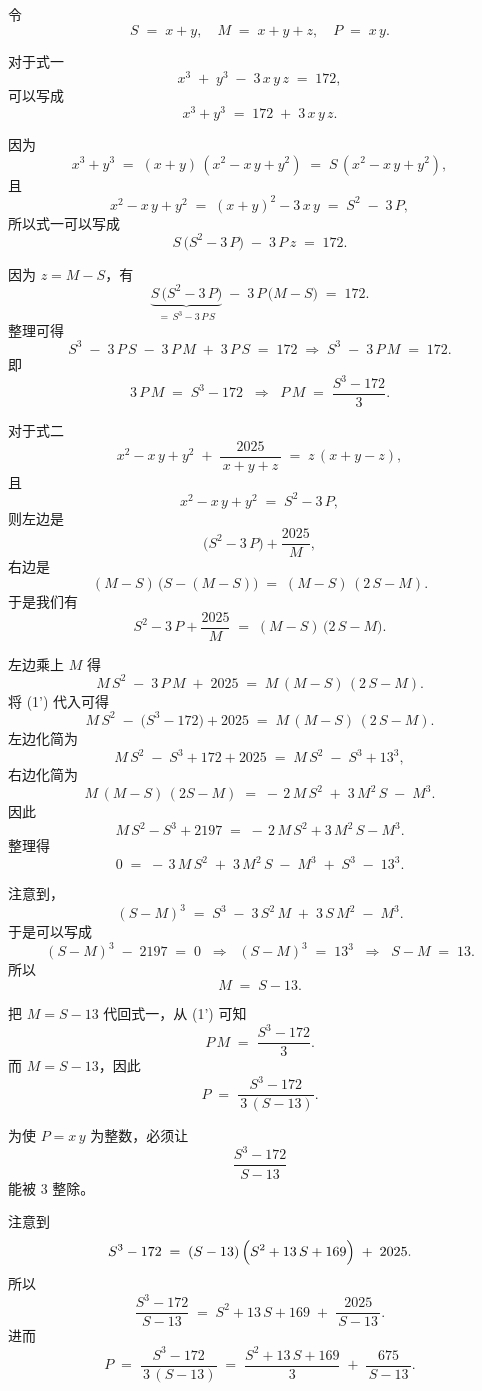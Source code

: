 \documentclass[12pt, a4paper]{article}
\theoremstyle{definition}
\theoremstyle{remark}
\begin{document}
\noindent 令
$$
S \;=\; x + y, 
\quad
M \;=\; x + y + z,
\quad
P \;=\; x\,y.
$$

\noindent 对于式一
$$
x^3 \;+\; y^3 \;-\; 3\,x\,y\,z \;=\; 172,
$$
可以写成
$$
x^3 + y^3 \;=\; 172 \;+\; 3\,x\,y\,z.
$$

\noindent 因为
$$
x^3 + y^3 
\;=\;
(x+y)\,(x^2 - x\,y + y^2)
\;=\;
S\,(x^2 - x\,y + y^2),
$$
且
$$
x^2 - x\,y + y^2 
\;=\;
(x+y)^2 - 3\,x\,y 
\;=\;
S^2 \;-\;3\,P,
$$
所以式一可以写成
$$
S \,\bigl(S^2 - 3\,P \bigr)
\;-\;
3\,P\,z
\;=\;
172.
$$

\noindent 因为 \(z = M - S\)，有
$$
\underbrace{S \,\bigl(S^2 - 3\,P \bigr)}_{=\,S^3 - 3\,P\,S}
\;-\;
3\,P\,\bigl(M - S \bigr)
\;=\;
172.
$$
整理可得
$$
S^3 
\;-\;
3\,P\,S
\;-\;
3\,P\,M
\;+\;
3\,P\,S
\;=\;
172
\;\Longrightarrow\;
S^3 
\;-\;
3\,P\,M
\;=\;
172.
$$
即
\[
3\,P\,M 
\;=\;
S^3 - 172
\;\;\Longrightarrow\;\;
P\,M
\;=\;
\dfrac{S^3 - 172}{\,3\,}.
\tag{1'}
\]

\noindent 对于式二
$$
x^2 - x\,y + y^2 \;+\;\dfrac{2025}{\,x + y + z\,} 
\;=\;
z\,(x+y - z),
$$
且 
$$
x^2 - x\,y + y^2
\;=\;
S^2 - 3\,P,
$$
则左边是
$$
\bigl(S^2 - 3\,P\bigr) + \dfrac{2025}{\,M\,},
$$
右边是
$$
(M-S)\,\bigl(S - (M-S)\bigr)
\;=\;
(M-S)\,(2\,S - M).
$$
于是我们有
$$
S^2 - 3\,P + \dfrac{2025}{\,M\,}
\;=\;
(M - S)\,\bigl(2\,S - M\bigr).
$$

\noindent 左边乘上 \(M\) 得
$$
M\,S^2 \;-\; 3\,P\,M \;+\; 2025
\;=\;
M\,(M - S)\,(2\,S - M).
$$
将 (1') 代入可得
$$
M\,S^2 \;-\; \bigl(S^3 - 172\bigr) + 2025
\;=\;
M\,(M - S)\,(2\,S - M).
$$
左边化简为
$$
M\,S^2 \;-\; S^3 + 172 + 2025
\;=\;
M\,S^2 \;-\; S^3 + 13^3,
$$
右边化简为
$$
M\,(M-S)\,(2S - M)
\;=\;
-\,2\,M\,S^2 \;+\;3\,M^2\,S \;-\;M^3.
$$
因此
$$
M\,S^2 - S^3 + 2197
\;=\;
-\,2\,M\,S^2 + 3\,M^2\,S - M^3.
$$
整理得
$$
0
\;=\;
-\,3\,M\,S^2 
\;+\;
3\,M^2\,S
\;-\;
M^3
\;+\;
S^3
\;-\;
13^3.
$$

\noindent 注意到，
$$
(S - M)^3 
\;=\;
S^3
\;-\;3\,S^2\,M
\;+\;3\,S\,M^2
\;-\;M^3.
$$
于是可以写成
\[
(S-M)^3 \;-\;2197 \;=\;0
\;\;\Longrightarrow\;\;
(S-M)^3 \;=\;13^3
\;\;\Longrightarrow\;\;
S - M 
\;=\;
13.
\]
所以
\[
M 
\;=\;
S - 13.
\tag{2'}
\]

\noindent 把 \(M = S - 13\) 代回式一，从 (1') 可知
$$
P\,M 
\;=\;
\dfrac{S^3 - 172}{\,3\,}.
$$
而 \(M = S - 13\)，因此
$$
P 
\;=\;
\dfrac{\,S^3 - 172\,}{\,3\,(S - 13)\!}.
$$

\noindent 为使 \(P = x\,y\) 为整数，必须让
$$
\dfrac{S^3 - 172}{\,S - 13\,}
$$
能被 \(3\) 整除。

\noindent 注意到
$$
S^3 - 172 
\;=\;
(S - 13)\,\Bigl(S^2 + 13\,S + 169\Bigr)
\;+\;
2025.
$$
所以
$$
\dfrac{S^3 - 172}{\,S - 13\,}
\;=\;
S^2 + 13\,S + 169 
\;+\;
\dfrac{2025}{\,S - 13\,}.
$$
进而
\[
P
\;=\;
\dfrac{\,S^3 - 172\,}{\,3\,(S - 13)\!}
\;=\;
\dfrac{S^2 + 13\,S + 169}{\,3\,}
\;+\;
\dfrac{675}{\,S - 13\,}.
\tag{3}
\]
\end{document}
